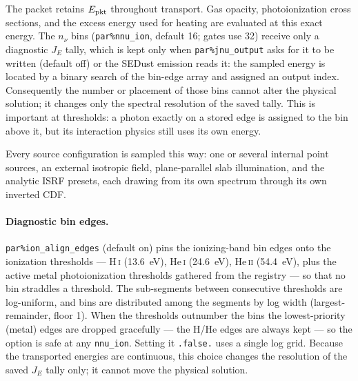 \documentclass[english,a4paper]{my_memo}
\newcommand{\code}[1]{\texttt{#1}}
\begin{document}
The packet retains $E_{\rm pkt}$ throughout transport.  Gas opacity,
photoionization cross sections, and the excess energy used for heating are
evaluated at this exact energy.  The $n_\nu$ bins
(\code{par\%nnu\_ion}, default 16; gates use 32) receive only a diagnostic
$J_E$ tally, which is kept only when \code{par\%jnu\_output} asks for it to
be written (default off) or the SEDust emission reads it: the sampled energy
is located by a binary search of the bin-edge array and assigned an output
index.  Consequently the number or placement of those bins cannot alter the
physical solution; it changes only the spectral resolution of the saved
tally.  This is
important at thresholds: a photon exactly on a stored edge is assigned to
the bin above it, but its interaction physics still uses its own energy.

Every source configuration is sampled this way: one or several internal
point sources, an external isotropic field, plane-parallel slab
illumination, and the analytic ISRF presets, each drawing from its own
spectrum through its own inverted CDF.

\paragraph{Diagnostic bin edges.}  \code{par\%ion\_align\_edges} (default
on) pins the ionizing-band bin edges onto the ionization thresholds --- H\,\textsc{i}
(13.6~eV), He\,\textsc{i} (24.6~eV), He\,\textsc{ii} (54.4~eV), plus the
active metal photoionization thresholds gathered from the registry ---
so that no bin straddles a threshold.  The sub-segments between
consecutive thresholds are log-uniform, and bins are distributed among
the segments by log width (largest-remainder, floor 1).  When the
thresholds outnumber the bins the lowest-priority (metal) edges are
dropped gracefully --- the H/He edges are always kept --- so the option
is safe at any \code{nnu\_ion}.  Setting it \code{.false.} uses a
single log grid.  Because the transported energies are continuous, this
choice changes the resolution of the saved $J_E$ tally only; it cannot move
the physical solution.
\end{document}
